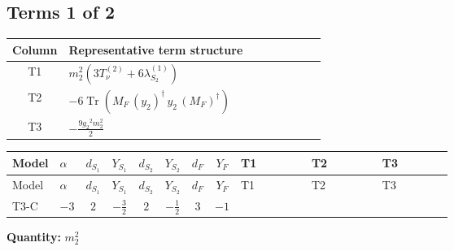 \documentclass[8pt]{article}
\begin{document}
\begin{landscape}
\subsection*{Terms 1 of 2}
\begin{center}
\begin{tabular}{@{}c >{\raggedright\arraybackslash}p{0.82\linewidth}@{}}
\toprule
Column & Representative term structure \\
\midrule
T1 & \(\displaystyle {m_2^2} (3 T_{\nu}^{(2)}+6 {\lambda_{S_2}^{(1)}})\) \\
\midrule
T2 & \(\displaystyle -6 \operatorname{Tr}\!\left({M_F}\,\left({y_2}\right)^{\dagger}\,{y_2}\,\left({M_F}\right)^{\dagger}\right)\) \\
\midrule
T3 & \(\displaystyle -\frac{9 {g_2}^2 {m_2^2}}{2}\) \\
\midrule
\bottomrule
\end{tabular}
\end{center}
\smallskip
\tiny
\begin{longtable}{@{}llcccccc >{\raggedright\arraybackslash}p{0.21\linewidth} >{\raggedright\arraybackslash}p{0.21\linewidth} >{\raggedright\arraybackslash}p{0.21\linewidth}@{}}
\toprule
Model & $\alpha$ & $d_{S_1}$ & $Y_{S_1}$ & $d_{S_2}$ & $Y_{S_2}$ & $d_F$ & $Y_F$ & T1 & T2 & T3 \\
\midrule
\endfirsthead
\toprule
Model & $\alpha$ & $d_{S_1}$ & $Y_{S_1}$ & $d_{S_2}$ & $Y_{S_2}$ & $d_F$ & $Y_F$ & T1 & T2 & T3 \\
\midrule
\endhead
T3-C & $-3$ & $2$ & $-\frac{3}{2}$ & $2$ & $-\frac{1}{2}$ & $3$ & $-1$ & \scriptsize\adjustbox{max width=\linewidth}{$\begin{gathered} {m_2^2} (3 T_{\nu}^{(2)}+6 {\lambda_{S_2}^{(1)}})\end{gathered}$} & \scriptsize\adjustbox{max width=\linewidth}{$\begin{gathered} -6 \operatorname{Tr}\!\left({M_F}\,\left({y_2}\right)^{\dagger}\,{y_2}\,\left({M_F}\right)^{\dagger}\right)\end{gathered}$} & \scriptsize\adjustbox{max width=\linewidth}{$\begin{gathered} -\frac{9 {g_2}^2 {m_2^2}}{2}\end{gathered}$} \\
\midrule
\bottomrule
\end{longtable}
\clearpage
\noindent\textbf{Quantity: }$m_2^2$\par\smallskip

\end{landscape}
\end{document}
